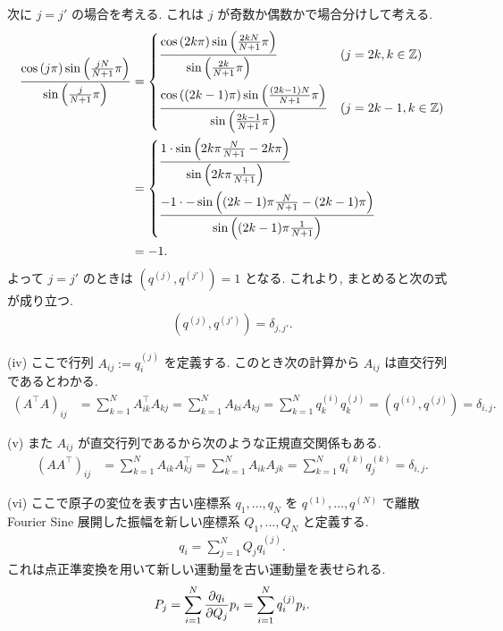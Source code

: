 \documentclass[uplatex,dvipdfmx,a4paper,11pt]{jlreq}
\newcommand{\ZZ}{\mathbb{Z}}
\theoremstyle{definition}
\begin{document}
次に $j = j'$ の場合を考える. これは $j$ が奇数か偶数かで場合分けして考える.
\begin{align}
  \frac{\cos\qty(j\pi)\sin\qty(\frac{jN}{N+1}\pi)}{\sin\qty(\frac{j}{N+1}\pi)} & =
  \begin{dcases}
    \frac{\cos\qty(2k\pi)\sin\qty(\frac{2kN}{N+1}\pi)}{\sin\qty(\frac{2k}{N+1}\pi)}           & (j = 2k, k\in\ZZ)   \\
    \frac{\cos\qty((2k-1)\pi)\sin\qty(\frac{(2k-1)N}{N+1}\pi)}{\sin\qty(\frac{2k-1}{N+1}\pi)} & (j = 2k-1, k\in\ZZ)
  \end{dcases} \\ & =
  \begin{dcases}
    \frac{1\cdot\sin\qty(2k\pi\frac{N}{N+1} - 2k\pi)}{\sin\qty(2k\pi\frac{1}{N+1})} \\
    \frac{-1 \cdot -\sin\qty((2k-1)\pi\frac{N}{N+1} - (2k-1)\pi)}{\sin\qty((2k-1)\pi\frac{1}{N+1})}
  \end{dcases}         \\
                                                                               & = -1.
\end{align}
よって $j = j'$ のときは $(q^{(j)}, q^{(j')}) = 1$ となる. これより, まとめると次の式が成り立つ.
\begin{align}
  (q^{(j)}, q^{(j')}) = \delta_{j,j'}.
\end{align}


(iv) ここで行列 $A_{ij} := q_i^{(j)}$ を定義する. このとき次の計算から $A_{ij}$ は直交行列であるとわかる.
\begin{align}
  (A^{\top}A)_{ij} & = \sum_{k=1}^{N}A_{ik}^\top A_{kj} = \sum_{k=1}^{N}A_{ki}A_{kj} = \sum_{k=1}^{N}q_k^{(i)}q_k^{(j)} = (q^{(i)}, q^{(j)}) = \delta_{i,j}.
\end{align}

(v) また $A_{ij}$ が直交行列であるから次のような正規直交関係もある.
\begin{align}
  (AA^{\top})_{ij} & = \sum_{k=1}^{N}A_{ik}A_{kj}^{\top} = \sum_{k=1}^{N}A_{ik}A_{jk} = \sum_{k=1}^{N}q_i^{(k)}q_j^{(k)} = \delta_{i,j}.
\end{align}

(vi) ここで原子の変位を表す古い座標系 $q_1, \ldots, q_N$ を $q^{(1)}, \ldots, q^{(N)}$ で離散 Fourier Sine 展開した振幅を新しい座標系 $Q_1, \ldots, Q_N$ と定義する.
\begin{align}
  q_i = \sum_{j=1}^{N}Q_jq_i^{(j)}.
\end{align}
これは点正準変換を用いて新しい運動量を古い運動量を表せられる.
\begin{align}
  P_j = \sum_{i=1}^{N}\pdv{q_i}{Q_j}p_i = \sum_{i=1}^{N}q_i^{(j)}p_i.
\end{align}
\end{document}
